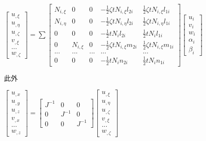 \documentclass[forprint]{WHUBachelor}
\begin{document}
\begin{center}
$\left[\begin{matrix}
u_{,\xi}\\u_{,\eta}\\u_{,\zeta}\\v_{,\xi}\\...\\w_{,\zeta}
\end{matrix}\right]=\sum\left[\begin{matrix}
N_{i,\xi}&0&0&-\frac{1}{2}\zeta tN_{i,\xi}l_{2i}&\frac{1}{2}\zeta tN_{i,\xi}l_{1i}\\N_{i,\eta}&0&0&-\frac{1}{2}\zeta tN_{i,\eta}l_{2i}&\frac{1}{2}\zeta tN_{i,\eta}l_{1i}\\0&0&0&-\frac{1}{2}tN_il_{2i}&\frac{1}{2}tN_il_{1i}\\0&N_{i,\xi}&0&-\frac{1}{2}\zeta tN_{i,\xi}m_{2i}&\frac{1}{2}\zeta tN_{i,\xi}m_{1i}\\...&...&...&...&...\\0&0&0&-\frac{1}{2}tN_in_{2i}&\frac{1}{2}tN_in_{1i}
\end{matrix}\right]\left[\begin{matrix}
u_i\\v_i\\w_i\\\alpha_i\\\beta_i
\end{matrix}\right]$
\end{center}
此外
\begin{center}
$\left[\begin{matrix}
u_{,x}\\u_{,y}\\u_{,z}\\v_{,x}\\...\\w_{,z}
\end{matrix}\right]=\left[\begin{matrix}
J^{-1}&0&0\\0&J^{-1}&0\\0&0&J^{-1}
\end{matrix}\right]\left[\begin{matrix}
u_{,\xi}\\u_{,\eta}\\u_{,\zeta}\\v_{,\xi}\\...\\w_{,\zeta}
\end{matrix}\right]$
\end{center}
\end{document}
